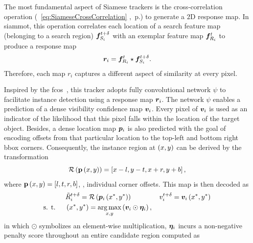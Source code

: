 The most fundamental aspect of Siamese trackers is the cross-correlation operation (\sectiontext{}~\ref{eq:SiameseCrossCorrelation} ,~p.\pageref{eq:SiameseCrossCorrelation}) to generate a $2$D response map. In \gls{siammot}, this operation correlates each location of a search feature map (belonging to a search region) $\bm{f}_{S_i}^{t + \delta}$ with an exemplar feature map $\bm{f}_{R_i}^{t}$ to produce a response map
\begin{equation}
    \bm{r}_{i} = \bm{f}_{R_i}^{t} \star \bm{f}_{S_i}^{t + \delta}.
\end{equation}
Therefore, each map $r_i$ captures a different aspect of similarity at every pixel.

Inspired by the \gls{fcos}~\cite{tian2019fcos}, this tracker adopts fully convolutional network $\psi$ to facilitate instance detection using a response map $\bm{r}_{i}$. The network $\psi$ enables a prediction of a dense visibility confidence map $\bm{v}_{i}$. Every pixel of $\bm{v}_{i}$ is used as an indicator of the likelihood that this pixel falls within the location of the target object. Besides, a dense location map $\bm{p}_{i}$ is also predicted with the goal of encoding offsets from that particular location to the top-left and bottom right \gls{bbox} corners. Consequently, the instance region at $\left( {x, y} \right)$ can be derived by the transformation
\begin{equation}
    {\mathcal{R}} \left( {\mathbf{p}} \left( x, y \right) \right) =
    \left[ {x - l, y - t, x + r, y + b} \right],
\end{equation}
where ${\mathbf{p}} \left( x, y \right) = \left[ {l, t, r, b} \right]$, \ietext{}, individual corner offsets. This map is then decoded as
\begin{equation}
    \begin{aligned}
                            & {\tilde{R}}_{i}^{t + \delta} =
        {\mathcal{R}} \left( {\bm{p}_{i}} \left( x^*, y^* \right) \right)                                                                      \qquad \qquad
        {v}_{i}^{t + \delta} = {\bm{v}_{i}} \left( x^*, y^* \right)                                                              \\
        \text{s. t. } \quad & \left( {x^*, y^*} \right) = \underset{x, y}{\operatorname*{arg\,max}} \left( {\bm{v}_{i} \odot \bm{\eta}_{i}} \right),
    \end{aligned}
\end{equation}
in which $\odot$ symbolizes an element-wise multiplication, $\bm{\eta}_{i}$ incurs a non-negative penalty score throughout an entire candidate region computed as
